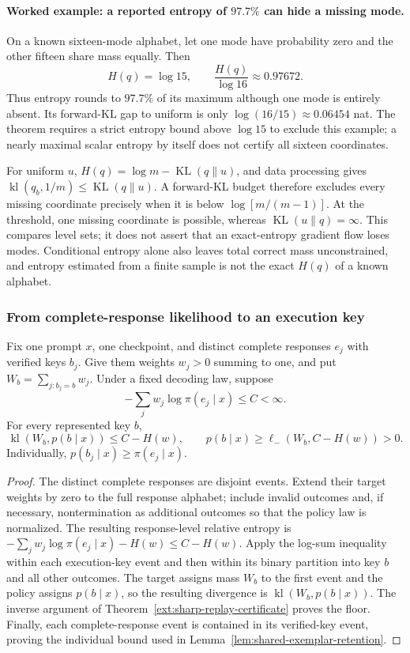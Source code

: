 \paragraph{Worked example: a reported entropy of $97.7\%$ can hide a missing mode.}
On a known sixteen-mode alphabet, let one mode have probability zero and the
other fifteen share mass equally. Then
\[
 H(q)=\log15,\qquad \frac{H(q)}{\log16}\approx0.97672.
\]
Thus entropy rounds to $97.7\%$ of its maximum although one mode is entirely
absent. Its forward-KL gap to uniform is only
$\log(16/15)\approx0.06454$ nat. The theorem requires a strict entropy bound
above $\log15$ to exclude this example; a nearly maximal scalar entropy by
itself does not certify all sixteen coordinates.

For uniform $u$, $H(q)=\log m-\operatorname{KL}(q\|u)$, and data processing
gives $\operatorname{kl}(q_b,1/m)\le\operatorname{KL}(q\|u)$. A forward-KL
budget therefore excludes every missing coordinate precisely when it is
below $\log[m/(m-1)]$. At the threshold, one missing coordinate is possible,
whereas $\operatorname{KL}(u\|q)=\infty$. This compares level sets; it does
not assert that an exact-entropy gradient flow loses modes. Conditional
entropy alone also leaves total correct mass unconstrained, and entropy
estimated from a finite sample is not the exact $H(q)$ of a known alphabet.

\subsubsection{From complete-response likelihood to an execution key}

\begin{corollary}
\label{ext:response-key-certificate}
Fix one prompt $x$, one checkpoint, and distinct complete responses $e_j$
with verified keys $b_j$. Give them weights $w_j>0$ summing to one, and put
$W_b=\sum_{j:b_j=b}w_j$. Under a fixed decoding law, suppose
\[
 -\sum_j w_j\log\pi(e_j\mid x)\le C<\infty.
\]
For every represented key $b$,
\[
 \operatorname{kl}(W_b,p(b\mid x))\le C-H(w),\qquad
 p(b\mid x)\ge\ell_-(W_b,C-H(w))>0.
\]
Individually, $p(b_j\mid x)\ge\pi(e_j\mid x)$.
\end{corollary}
\begin{proof}
The distinct complete responses are disjoint events. Extend their target
weights by zero to the full response alphabet; include invalid outcomes
and, if necessary, nontermination as additional outcomes so that the policy
law is normalized. The resulting response-level relative entropy is
$-\sum_jw_j\log\pi(e_j\mid x)-H(w)\le C-H(w)$. Apply the log-sum inequality
within each execution-key event and then within its binary partition into
key $b$ and all other outcomes. The target assigns mass $W_b$ to the first
event and the policy assigns $p(b\mid x)$, so the resulting divergence is
$\operatorname{kl}(W_b,p(b\mid x))$. The inverse argument of
Theorem~\ref{ext:sharp-replay-certificate} proves the floor. Finally, each
complete-response event is contained in its verified-key event, proving
the individual bound used in Lemma~\ref{lem:shared-exemplar-retention}.
\end{proof}

